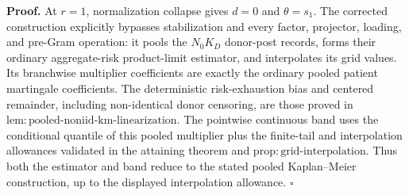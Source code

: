 \textbf{Proof.}
At \(r=1\), normalization collapse gives \(d=0\) and \(\theta=s_1\).  The corrected construction explicitly bypasses stabilization and every factor, projector, loading, and pre-Gram operation: it pools the \(N_0K_D\) donor-post records, forms their ordinary aggregate-risk product-limit estimator, and interpolates its grid values.  Its branchwise multiplier coefficients are exactly the ordinary pooled patient martingale coefficients.  The deterministic risk-exhaustion bias and centered remainder, including non-identical donor censoring, are those proved in \(\mathrm{lem:pooled\mbox{-}noniid\mbox{-}km\mbox{-}linearization}\).  The pointwise continuous band uses the conditional quantile of this pooled multiplier plus the finite-tail and interpolation allowances validated in the attaining theorem and \(\mathrm{prop:grid\mbox{-}interpolation}\).  Thus both the estimator and band reduce to the stated pooled Kaplan--Meier construction, up to the displayed interpolation allowance. \(\square\)